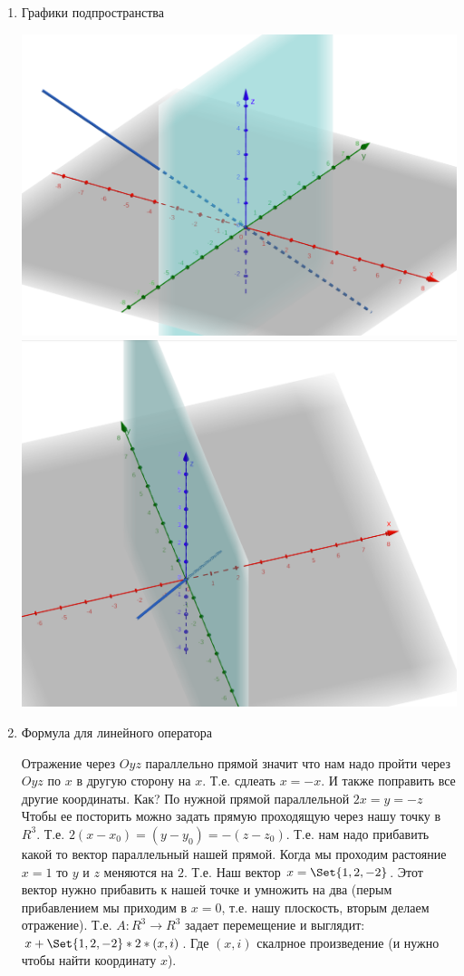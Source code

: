 \begin{enumerate}
	\item Графики подпространства
	
	\includegraphics[scale=0.15]{ss2a_1.png}
	\includegraphics[scale=0.15]{ss2a_2.png}

	\item Формула для линейного оператора
	
	Отражение через $Oyz$ параллельно прямой значит что нам надо пройти через $Oyz$ по $x$ в другую сторону на $x$. Т.е. сдлеать $x=-x$. И также поправить все другие координаты. Как? По нужной прямой параллельной $2x=y=-z$
	Чтобы ее посторить можно задать прямую проходящую через нашу точку в $R^3$. Т.е. $2(x-x_0)=(y-y_0)=-(z-z_0)$. Т.е. нам надо прибавить какой то вектор параллельный нашей прямой.
	Когда мы проходим растояние $x=1$ то $y$ и $z$ меняются на $2$. Т.е. Наш вектор $x = \Set{1, 2, -2}$. Этот вектор нужно прибавить к нашей точке и умножить на два (перым прибавлением мы приходим в $x=0$, т.е. нашу плоскость, вторым делаем отражение).
	Т.е. $A: R^3 \rightarrow R^3$ задает перемещение и выглядит: $x + \Set{1,2,-2} * 2 * (x, i)$. Где $(x,i)$ скалрное произведение (и нужно чтобы найти координату $x$).
	

\end{enumerate}
